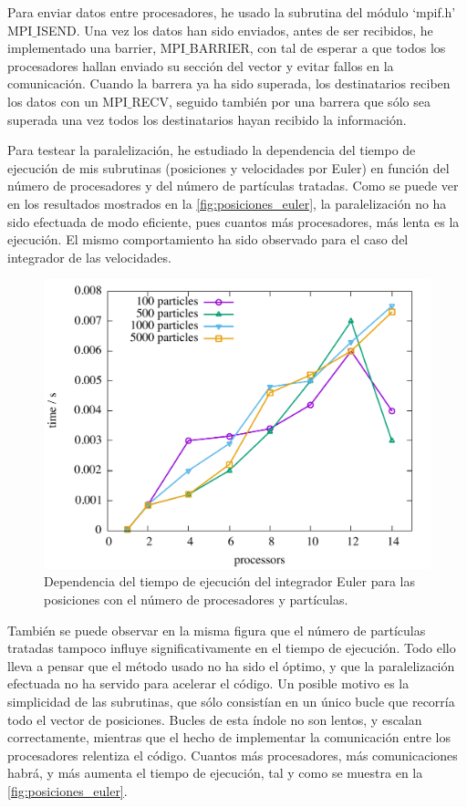 \documentclass[onecolumn]{article}
\begin{document}
 Para enviar datos entre procesadores, he usado la subrutina del módulo `mpif.h' MPI$\_$ISEND. Una vez los datos han sido enviados, antes de ser recibidos, he implementado
 una barrier, MPI$\_$BARRIER, con tal de esperar a que todos los procesadores hallan enviado su sección del vector y evitar fallos en la comunicación. Cuando la barrera ya ha sido
 superada, los destinatarios reciben los datos con un MPI$\_$RECV, seguido también por una barrera que sólo sea superada una vez todos los destinatarios hayan recibido la información.
 
 Para testear la paralelización, he estudiado la dependencia del tiempo de ejecución de mis subrutinas (posiciones y velocidades por Euler) en función del número de procesadores
 y del número de partículas tratadas. Como se puede ver en los resultados mostrados en la \autoref{fig:posiciones_euler}, la paralelización no ha sido efectuada de modo eficiente,
 pues cuantos más procesadores, más lenta es la ejecución. El mismo comportamiento ha sido observado para el caso del integrador de las velocidades.
 
 \begin{figure}[h!]
	\includegraphics[scale=0.5]{scalate_euler.pdf}
	\caption{Dependencia del tiempo de ejecución del integrador Euler para las posiciones con el número de procesadores y partículas.}
	\label{fig:posiciones_euler}
\end{figure}

	También se puede observar en la misma figura que el número de partículas tratadas tampoco influye significativamente en el tiempo de ejecución. Todo ello lleva a pensar que el método
	usado no ha sido el óptimo, y que la paralelización efectuada no ha servido para acelerar el código. Un posible motivo es la simplicidad de las subrutinas, que sólo consistían en un
	único bucle que recorría todo el vector de posiciones. Bucles de esta índole no son lentos, y escalan correctamente, mientras que el hecho de implementar la comunicación entre los procesadores
	relentiza el código. Cuantos más procesadores, más comunicaciones habrá, y más aumenta el tiempo de ejecución, tal y como se muestra en la \autoref{fig:posiciones_euler}.
\end{document}
